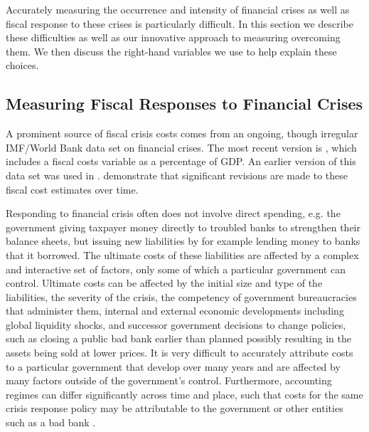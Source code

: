 \documentclass[]{article}
\begin{document}
Accurately measuring the occurrence and intensity of financial crises as well as fiscal response to these crises is particularly difficult. In this section we describe these difficulties as well as our innovative approach to measuring overcoming them. We then discuss the right-hand variables we use to help explain these choices.

\subsection*{Measuring Fiscal Responses to Financial Crises}

A prominent source of fiscal crisis costs comes from an ongoing, though irregular IMF/World Bank data set on financial crises. The most recent version is \cite{laeven2013}, which includes a fiscal costs variable as a percentage of GDP. An earlier version of this data set was used in \cite{Keefer2007}. \cite{GandrudHallerberg2015} demonstrate that significant revisions are made to these fiscal cost estimates over time.

Responding to financial crisis often does not involve direct spending, e.g. the government giving taxpayer money directly to troubled banks to strengthen their balance sheets, but issuing new liabilities by for example lending money to banks that it borrowed. The ultimate costs of these liabilities are affected by a complex and interactive set of factors, only some of which a particular government can control. Ultimate costs can be affected by the initial size and type of the liabilities, the severity of the crisis, the competency of government bureaucracies that administer them, internal and external economic developments including global liquidity shocks, and successor government decisions to change policies, such as closing a public bad bank earlier than planned possibly resulting in the assets being sold at lower prices. It is very difficult to accurately attribute costs to a particular government that develop over many years and are affected by many factors outside of the government's control. Furthermore, accounting regimes can differ significantly across time and place, such that costs for the same crisis response policy may be attributable to the government or other entities such as a bad bank \citep{gandrudHallerbergWEP}.
\end{document}
